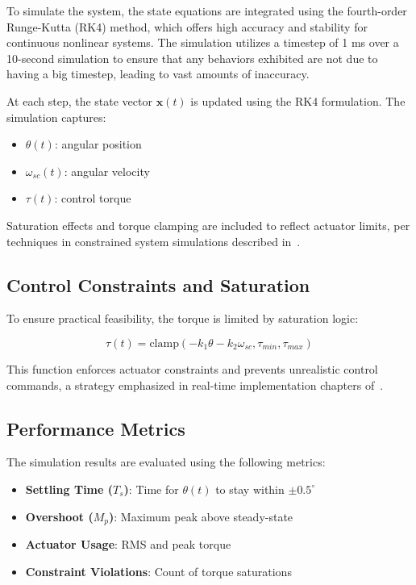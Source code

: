 \documentclass{ifacconf}
\begin{document}
To simulate the system, the state equations are integrated using the fourth-order Runge-Kutta (RK4) method, which offers high accuracy and stability for continuous nonlinear systems. The simulation utilizes a timestep of 1 ms over a 10-second simulation to ensure that any behaviors exhibited are not due to having a big timestep, leading to vast amounts of inaccuracy.

At each step, the state vector $\mathbf{x}(t)$ is updated using the RK4 formulation. The simulation captures:

\begin{itemize}
  \item $\theta(t)$: angular position
  \item $\omega_{sc}(t)$: angular velocity
  \item $\tau(t)$: control torque
\end{itemize}

Saturation effects and torque clamping are included to reflect actuator limits, per techniques in constrained system simulations described in~\cite{friedland2005control}.

\subsection{Control Constraints and Saturation}

To ensure practical feasibility, the torque is limited by saturation logic:

\begin{equation}
\tau(t) = \text{clamp}(-k_1 \theta - k_2 \omega_{sc}, \tau_{min}, \tau_{max})
\end{equation}

This function enforces actuator constraints and prevents unrealistic control commands, a strategy emphasized in real-time implementation chapters of~\cite{friedland2005control}.

\subsection{Performance Metrics}

The simulation results are evaluated using the following metrics:

\begin{itemize}
  \item \textbf{Settling Time ($T_s$)}: Time for $\theta(t)$ to stay within $\pm 0.5^\circ$
  \item \textbf{Overshoot ($M_p$)}: Maximum peak above steady-state
  \item \textbf{Actuator Usage}: RMS and peak torque
  \item \textbf{Constraint Violations}: Count of torque saturations
\end{itemize}
\end{document}
